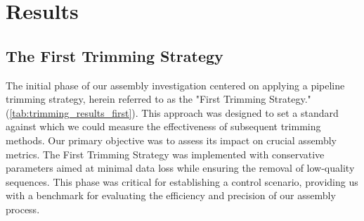 \chapter{Results} \label{sec:results}

\section{The First Trimming Strategy } \label{sec:1st_trimming_stratrgy}

The initial phase of our \gls{assembly} investigation centered on applying a pipeline \gls{trimming} strategy, herein referred to as the "First Trimming Strategy." (\autoref{tab:trimming_results_first}). This approach was designed to set a standard against which we could measure the effectiveness of subsequent \gls{trimming} methods. Our primary objective was to assess its impact on crucial \gls{assembly} metrics. The First Trimming Strategy was implemented with conservative parameters aimed at minimal data loss while ensuring the removal of low-quality sequences. This phase was critical for establishing a control scenario, providing us with a benchmark for evaluating the efficiency and precision of our \gls{assembly} process.

